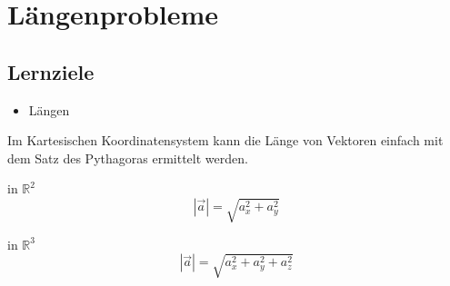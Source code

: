 \section{Längenprobleme}

\subsection*{Lernziele}
\begin{itemize}
\item Längen
\end{itemize}

Im Kartesischen Koordinatensystem kann die Länge von Vektoren einfach
mit dem Satz des Pythagoras ermittelt werden.

\begin{gesetz}{in $\mathbb{R}^2$}{}
  $$|\vec{a}| = \sqrt{a_x^2 + a_y^2}$$
\end{gesetz}

\begin{gesetz}{in $\mathbb{R}^3$}{}
  $$|\vec{a}| = \sqrt{a_x^2 + a_y^2 + a_z^2}$$
\end{gesetz}

